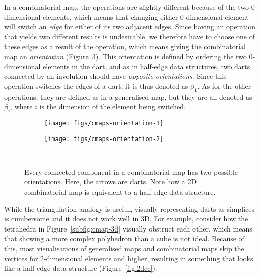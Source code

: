 In a combinatorial map, the operations are slightly different because of the two \(0\)-dimensional elements, which means that changing either \(0\)-dimensional element will switch an \emph{edge} for either of its two adjacent edges.
Since having an operation that yields two different results is undesirable, we therefore have to choose one of these edges as a result of the operation, which means giving the combinatorial map an \emph{orientation} (Figure~\ref{fig:cmaps-orientation}).
This orientation is defined by ordering the two \(0\)-dimensional elements in the dart, and as in half-edge data structures, two darts connected by an involution should have \emph{opposite orientations}.
Since this operation switches the edges of a dart, it is thus denoted as \(\beta_1\).
As for the other operations, they are defined as in a generalised map, but they are all denoted as \(\beta_i\), where \(i\) is the dimension of the element being switched.

\begin{figure}
\centering
\begin{subfigure}{0.33\linewidth}
\texttt{[image: figs/cmaps-orientation-1]}
\caption{}%
\label{subfig:cmaps-orientation-1}
\end{subfigure}%
\quad
\begin{subfigure}{0.33\linewidth}
\texttt{[image: figs/cmaps-orientation-2]}
\caption{}%
\label{subfig:cmaps-orientation-2}
\end{subfigure}\\
\caption{Every connected component in a combinatorial map has two possible orientations.
Here, the arrows are darts.
Note how a 2D combinatorial map is equivalent to a half-edge data structure.}%
\label{fig:cmaps-orientation}
\end{figure}

While the triangulation analogy is useful, visually representing darts as simplices is cumbersome and it does not work well in 3D.
For example, consider how the tetrahedra in Figure~\ref{subfig:cmap-3d} visually obstruct each other, which means that showing a more complex polyhedron than a cube is not ideal.
Because of this, most visualisations of generalised maps and combinatorial maps skip the vertices for 2-dimensional elements and higher, resulting in something that looks like a half-edge data structure (Figure~\ref{fig:2dcc}).


